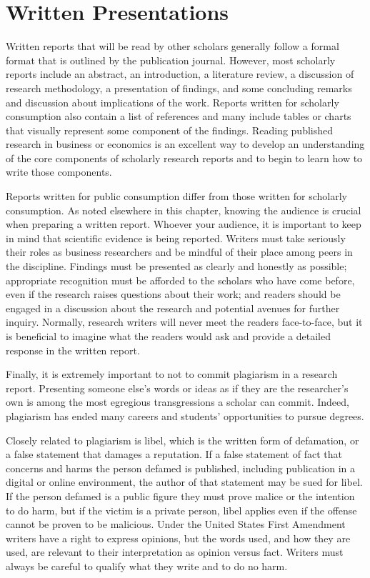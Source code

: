 \section{Written Presentations}

Written reports that will be read by other scholars generally follow a formal format that is outlined by the publication journal. However, most scholarly reports include an abstract, an introduction, a literature review, a discussion of research methodology, a presentation of findings, and some concluding remarks and discussion about implications of the work. Reports written for scholarly consumption also contain a list of references and many include tables or charts that visually represent some component of the findings. Reading published research in business or economics is an excellent way to develop an understanding of the core components of scholarly research reports and to begin to learn how to write those components.

Reports written for public consumption differ from those written for scholarly consumption. As noted elsewhere in this chapter, knowing the audience is crucial when preparing a written report. Whoever your audience, it is important to keep in mind that scientific evidence is being reported. Writers must take seriously their roles as business researchers and be mindful of their place among peers in the discipline. Findings must be presented as clearly and honestly as possible; appropriate recognition must be afforded to the scholars who have come before, even if the research raises questions about their work; and readers should be engaged in a discussion about the research and potential avenues for further inquiry. Normally, research writers will never meet the readers face-to-face, but it is beneficial to imagine what the readers would ask and provide a detailed response in the written report.

Finally, it is extremely important to not to commit plagiarism in a research report. Presenting someone else's words or ideas as if they are the researcher's own is among the most egregious transgressions a scholar can commit. Indeed, plagiarism has ended many careers and students' opportunities to pursue degrees\cite{maurer2006plagiarism}.

Closely related to plagiarism is libel, which is the written form of defamation, or a false statement that damages a reputation. If a false statement of fact that concerns and harms the person defamed is published, including publication in a digital or online environment, the author of that statement may be sued for libel. If the person defamed is a public figure they must prove malice or the intention to do harm, but if the victim is a private person, libel applies even if the offense cannot be proven to be malicious. Under the United States First Amendment writers have a right to express opinions, but the words used, and how they are used, are relevant to their interpretation as opinion versus fact. Writers must always be careful to qualify what they write and to do no harm.

